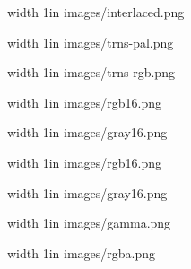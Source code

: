  
\def\inc#1{\pdfximage width 1in {images/#1}\pdfrefximage\pdflastximage\par}
\inc{interlaced.png}\inc{trns-pal.png}\inc{trns-rgb.png}
 \inc{rgb16.png}\inc{gray16.png}
 \inc{rgb16.png}\inc{gray16.png}
 \inc{gamma.png}
\inc{rgba.png}
\bye
